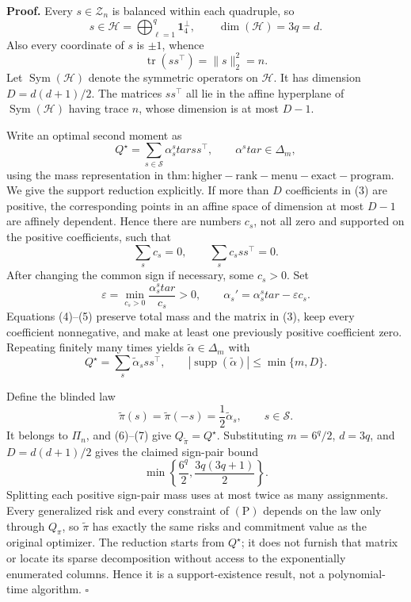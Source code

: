 \textbf{Proof.}
Every \(s\in\mathcal Z_n\) is balanced within each quadruple, so
\[
s\in\mathcal H
=\bigoplus_{\ell=1}^q\mathbf1_4^\perp,
\qquad \dim(\mathcal H)=3q=d. \tag{1}
\]
Also every coordinate of \(s\) is \(\pm1\), whence
\[
\operatorname{tr}(ss^\top)=\|s\|_2^2=n. \tag{2}
\]
Let \(\operatorname{Sym}(\mathcal H)\) denote the symmetric operators on \(\mathcal H\).  It has dimension
\(D=d(d+1)/2\).  The matrices \(ss^\top\) all lie in the affine hyperplane of \(\operatorname{Sym}(\mathcal H)\) having trace \(n\), whose dimension is at most \(D-1\).

Write an optimal second moment as
\[
Q^\star=\sum_{s\in\mathscr S}\alpha_s^star ss^\top,
\qquad \alpha^star\in\Delta_m, \tag{3}
\]
using the mass representation in \(\mathrm{thm:higher-rank-menu-exact-program}\).  We give the support reduction explicitly.  If more than \(D\) coefficients in (3) are positive, the corresponding points in an affine space of dimension at most \(D-1\) are affinely dependent.  Hence there are numbers \(c_s\), not all zero and supported on the positive coefficients, such that
\[
\sum_sc_s=0,
\qquad
\sum_sc_sss^\top=0. \tag{4}
\]
After changing the common sign if necessary, some \(c_s>0\).  Set
\[
\varepsilon=\min_{c_s>0}\frac{\alpha_s^star}{c_s}>0,
\qquad
\alpha_s'=\alpha_s^star-\varepsilon c_s. \tag{5}
\]
Equations (4)--(5) preserve total mass and the matrix in (3), keep every coefficient nonnegative, and make at least one previously positive coefficient zero.  Repeating finitely many times yields \(\widetilde\alpha\in\Delta_m\) with
\[
Q^\star=\sum_s\widetilde\alpha_sss^\top,
\qquad
|\operatorname{supp}(\widetilde\alpha)|\le\min\{m,D\}. \tag{6}
\]

Define the blinded law
\[
\widetilde\pi(s)=\widetilde\pi(-s)=\frac12\widetilde\alpha_s,
\qquad s\in\mathscr S. \tag{7}
\]
It belongs to \(\Pi_n\), and (6)--(7) give \(Q_{\widetilde\pi}=Q^\star\).  Substituting \(m=6^q/2\), \(d=3q\), and \(D=d(d+1)/2\) gives the claimed sign-pair bound
\[
\min\left\{\frac{6^q}{2},\frac{3q(3q+1)}2\right\}. \tag{8}
\]
Splitting each positive sign-pair mass uses at most twice as many assignments.  Every generalized risk and every constraint of \((\mathrm P)\) depends on the law only through \(Q_\pi\), so \(\widetilde\pi\) has exactly the same risks and commitment value as the original optimizer.  The reduction starts from \(Q^\star\); it does not furnish that matrix or locate its sparse decomposition without access to the exponentially enumerated columns.  Hence it is a support-existence result, not a polynomial-time algorithm. \(\square\)